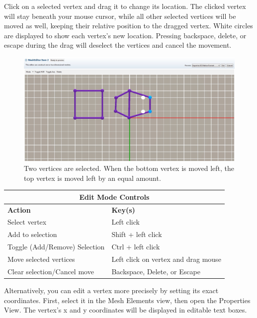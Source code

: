 \documentclass{article}
\begin{document}
Click on a selected vertex and drag it to change its location. The clicked
vertex will stay beneath your mouse cursor, while all other selected vertices
will be moved as well, keeping their relative position to the dragged vertex.
White circles are displayed to show each vertex's new location. Pressing
backspace, delete, or escape during the drag will deselect the vertices and
cancel the movement.

\begin{figure}
\begin{center}
\includegraphics[width=12cm]{images/MeshEditorDragVertex}
\caption{Two vertices are selected. When the bottom vertex is moved left, the
top vertex is moved left by an equal amount.}
\end{center}
\end{figure}

\begin{center}
    \begin{tabular}{| l | l |}
    \hline
    \multicolumn{2}{|c|}{\textbf{Edit Mode Controls}} \\
  	\hline
    \textbf{Action} & \textbf{Key(s)} \\ \hline
    Select vertex & Left click \\ \hline
    Add to selection & Shift + left click \\ \hline
    Toggle (Add/Remove) Selection & Ctrl + left click \\ \hline
    Move selected vertices & Left click on vertex and drag mouse \\ \hline
    Clear selection/Cancel move & Backspace, Delete, or Escape \\ 
    \hline
    \end{tabular}
\end{center}

Alternatively, you can edit a vertex more precisely by setting its exact
coordinates. First, select it in the Mesh Elements view, then open the
Properties View. The vertex's x and y coordinates will be displayed in editable
text boxes.
\end{document}

